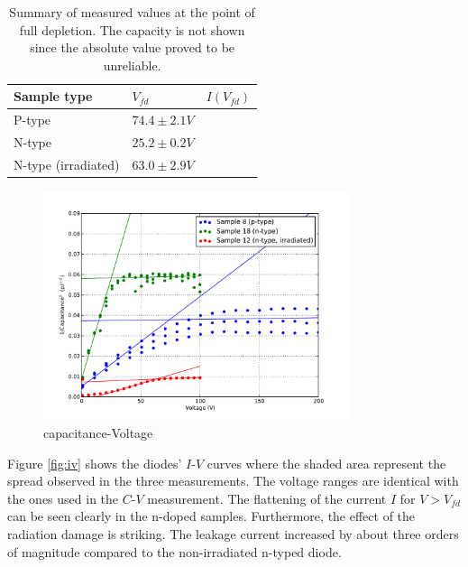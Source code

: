 \documentclass[11pt,a4paper]{report}
\begin{document}
\begin{table}
  \caption{Summary of measured values at the point of full depletion. The capacity is not shown since the absolute value proved to be unreliable.}\label{tab:results}
  \centering
  \begin{tabular}{lll}
    \toprule
    Sample type         & $V_{fd}$                 & $I(V_{fd})$ \\
    \midrule
    P-type              & $74.4 \pm 2.1 \si{V}$   &           \\
    N-type              & $25.2 \pm 0.2 \si{V}$  &             \\
    N-type (irradiated) & $63.0 \pm 2.9 \si{V}$ &             \\
    \bottomrule
  \end{tabular}
\end{table}



\label{sec:results}
\begin{figure}
  \centering
  \includegraphics[width=0.8\textwidth]{./figures/cv.pdf}  
  \caption{capacitance-Voltage }\label{fig:cv}
\end{figure}

Figure \ref{fig:iv} shows the diodes' $I$-$V$ curves where the shaded area represent the spread observed in the three measurements.
The voltage ranges are identical with the ones used in the $C$-$V$ measurement.
The flattening of the current $I$ for $V>V_{fd}$ can be seen clearly in the n-doped samples.
Furthermore, the effect of the radiation damage is striking.
The leakage current increased by about three orders of magnitude compared to the non-irradiated n-typed diode.
\end{document}
